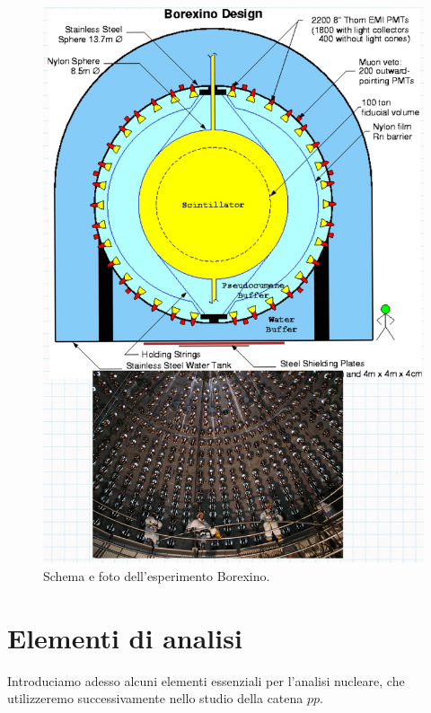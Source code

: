 \begin{itemize}
\begin{figure}[p!h]
        \centering
        \includegraphics[scale=0.2]{Immagini/0322_borexino.png}
        \caption{Schema e foto dell'esperimento Borexino.}
        \label{0322_box}
    \end{figure}
\end{itemize}

\newpage

\section{Elementi di analisi}
Introduciamo adesso alcuni elementi essenziali per l'analisi nucleare, che utilizzeremo successivamente nello studio della catena $pp$.

